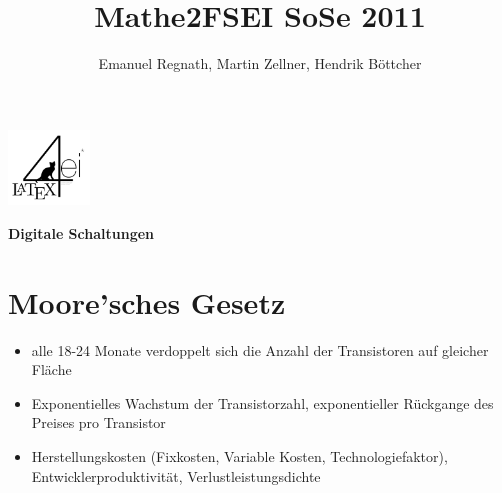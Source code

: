 \documentclass[6pt,a4paper]{scrartcl}
\title{Mathe2FSEI SoSe 2011}
\author{Emanuel Regnath, Martin Zellner, Hendrik Böttcher}
\renewcommand{\emph}[1]{\textsf{\textbf{#1}}}
\begin{document}
\begin{multicols}{3}

\parbox{2.3cm}{
	\includegraphics[height=2cm]{./img/Logo.pdf}
}
\parbox{4cm}{
	\emph{\huge{Digitale Schaltungen}}
}

\section{Moore'sches Gesetz}
\begin{itemize} \itemsep0pt
	\item alle 18-24 Monate verdoppelt sich die Anzahl der Transistoren auf gleicher Fläche
	\item Exponentielles Wachstum der Transistorzahl, exponentieller Rückgange des Preises pro Transistor
	\item Herstellungskosten (Fixkosten, Variable Kosten, Technologiefaktor), Entwicklerproduktivität, Verlustleistungsdichte
\end{itemize}


\end{multicols}
\end{document}
